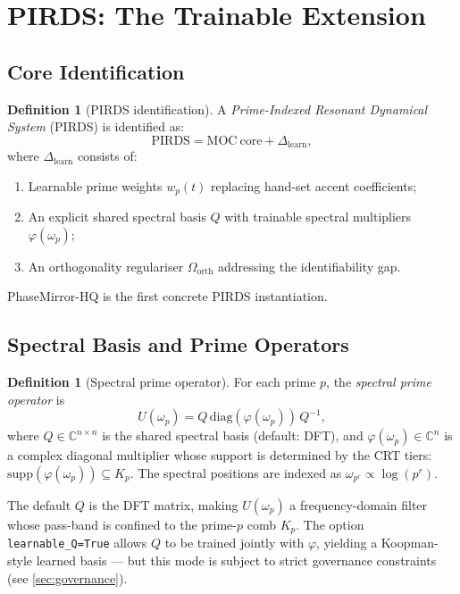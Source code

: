 \documentclass[11pt,a4paper]{article}
\theoremstyle{plain}
\theoremstyle{definition}
\newtheorem{definition}[theorem]{Definition}
\theoremstyle{remark}
\begin{document}
\section{PIRDS: The Trainable Extension}

\subsection{Core Identification}

\begin{definition}[PIRDS identification]
  A \emph{Prime-Indexed Resonant Dynamical System} (PIRDS) is identified as:
  \[
    \mathrm{PIRDS} = \mathrm{MOC\ core} + \Delta_{\mathrm{learn}},
  \]
  where $\Delta_{\mathrm{learn}}$ consists of:
  \begin{enumerate}[itemsep=2pt]
    \item Learnable prime weights $w_p(t)$ replacing hand-set accent coefficients;
    \item An explicit shared spectral basis $Q$ with trainable spectral multipliers $\varphi(\omega_p)$;
    \item An orthogonality regulariser $\Omega_\mathrm{orth}$ addressing the identifiability gap.
  \end{enumerate}
  PhaseMirror-HQ is the first concrete PIRDS instantiation.
\end{definition}

\subsection{Spectral Basis and Prime Operators}

\begin{definition}[Spectral prime operator]
  For each prime $p$, the \emph{spectral prime operator} is
  \[
    U(\omega_p) = Q\, \mathrm{diag}(\varphi(\omega_p))\, Q^{-1},
  \]
  where $Q \in \mathbb{C}^{n \times n}$ is the shared spectral basis (default: DFT),
  and $\varphi(\omega_p) \in \mathbb{C}^n$ is a complex diagonal multiplier whose
  support is determined by the CRT tiers: $\mathrm{supp}(\varphi(\omega_p)) \subseteq K_p$.
  The spectral positions are indexed as $\omega_{p^r} \propto \log(p^r)$.
\end{definition}

The default $Q$ is the DFT matrix, making $U(\omega_p)$ a frequency-domain filter
whose pass-band is confined to the prime-$p$ comb $K_p$. The option \texttt{learnable\_Q=True}
allows $Q$ to be trained jointly with $\varphi$, yielding a Koopman-style learned basis ---
but this mode is subject to strict governance constraints (see \cref{sec:governance}).
\end{document}
